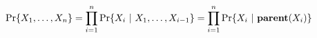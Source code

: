 
\begin{equation}
\Pr\{X_1,\ldots,X_n\}
= \prod_{i=1}^n \Pr\{X_i~|~X_1,\ldots,X_{i-1}\}
= \prod_{i=1}^n \Pr\{X_i~|~\mathbf{parent}(X_i)\}
\end{equation}

